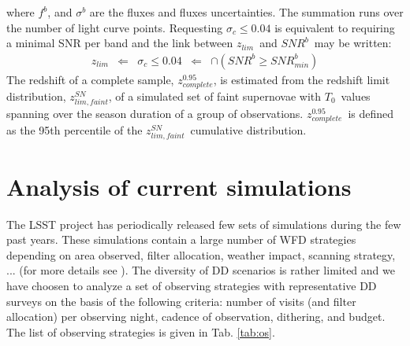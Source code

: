 \documentclass[\docopts]{\docclass}
\newcommand{\snrb}{\mbox{$SNR^b$}}
\newcommand{\snrbmin}{\mbox{$SNR^b_{min}$}}
\newcommand{\daymax}{$T_0$}
\newcommand{\sigc}{\mbox{$\sigma_c$}}
\newcommand{\zlim}{\mbox{$z_{lim}$}}
\newcommand{\zlimfaint}{\mbox{$z_{lim,faint}^{SN}$}}
\newcommand{\zcompb}{\mbox{$z_{complete}^{0.95}$}}
\begin{document}
where $f^b$, and $\sigma^b$ are the fluxes and fluxes uncertainties. The summation runs over the number of light curve points. Requesting \sigc$\leq 0.04$ is equivalent to requiring a minimal SNR per band and the link between \zlim~and \snrb~may be written:
\begin{equation}
  \begin{aligned}
    \zlim &\Longleftarrow & \sigc \leq 0.04 & \Longleftarrow &\cap (\snrb \geq \snrbmin)
    \end{aligned}
 \label{eq:zlimsnr}
\end{equation}
The redshift of a complete sample, \zcompb, is estimated from the redshift limit distribution, \zlimfaint, of a simulated set of faint supernovae with \daymax~values spanning over the season duration of a group of observations. \zcompb~is defined as the 95th percentile of the \zlimfaint~cumulative distribution.


\section{Analysis of current simulations}
\label{sec:analysis}
The LSST project has periodically released few sets of simulations during the few past years. These simulations contain a large number of WFD strategies depending on area observed, filter allocation, weather impact, scanning strategy, ... (for more details see ). The diversity of DD scenarios is rather limited and we have choosen to analyze a set of observing strategies with representative DD surveys on the basis of the following criteria: number of visits (and filter allocation) per observing night, cadence of observation, dithering, and budget. The list of observing strategies is given in Tab. \ref{tab:os}.
\end{document}
